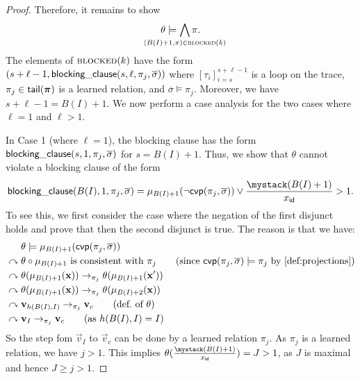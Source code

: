 {\begin{proof}
    Therefore, it remains to show
    \[
      \theta \models \bigwedge_{\mathclap{(B(I)+1,\pi) \in \blocked(k)}} \pi.
    \]
    The elements of $\textsc{blocked}(k)$ have the form $(s + \ell - 1, \mathsf{blocking\_clause}(s,\ell,\pi_j,\overline{\sigma}))$ where $[\tau_i]_{i=s}^{s+\ell-1}$ is a loop on the trace, $\pi_j \in \mathsf{tail}(\bm{\mathrm{\pi}})$ is a learned relation, and $\overline{\sigma} \models \pi_j$.
    Moreover, we have $s + \ell - 1 = B(I) + 1$.
    We now perform a case analysis for the two cases where $\ell = 1$ and $\ell > 1$.

    In Case 1 (where $\ell = 1$), the blocking clause has the form
    $\blockingclause(s,1,\linebreak \pi_j,\overline{\sigma})$ for $s = B(I)+1$.
    Thus, we show that $\theta$ cannot violate a blocking clause of the form
    \[
      \blockingclause(B(I),1,\pi_j,\overline{\sigma}) = \mu_{B(I)+1}(\neg\mbip(\pi_j,\overline{\sigma})) \lor \ind[\id]{x}{B(I)+1} > 1.
    \]
    To see this, we first consider the case where the negation of the first disjunct holds and prove that then the second disjunct is true.
    The reason is that we have:
    \begin{align*}
                             & \theta \models \mu_{B(I)+1}(\mbip(\pi_j, \overline{\sigma}))                                                                                     \\
      {} \curvearrowright {} & \theta \circ \mu_{B(I)+1} \text{ is consistent with } \pi_j \tag{since $\mbip(\pi_j,\overline{\sigma}) \models \pi_j$ by \Cref{def:projections}} \\
      {} \curvearrowright {} & \theta(\mu_{B(I)+1}(\vec{x})) \to_{\pi_j} \theta(\mu_{B(I)+1}(\vec{x}'))                                                                \\
      {} \curvearrowright {} & \theta(\mu_{B(I)+1}(\vec{x})) \to_{\pi_j} \theta(\mu_{B(I)+2}(\vec{x}))                                                                \\
      {} \curvearrowright {} & \vec{v}_{h(B(I),I)} \to_{\pi_j} \vec{v}_{c} \tag{def.\ of $\theta$}                                                                 \\
      {} \curvearrowright {} & \vec{v}_{I} \to_{\pi_j} \vec{v}_{c} \tag{as $h(B(I),I) = I$}
    \end{align*}
    So the step fom $\vec{v}_{I}$ to $\vec{v}_{c}$ can be done by a learned relation $\pi_j$.
    As $\pi_j$ is a learned relation, we have $j > 1$.
    This implies $\theta(\ind[\id]{x}{B(I)+1}) = J > 1$, as $J$ is maximal and hence $J \geq j > 1$.


\end{proof}}
